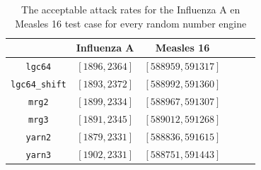 \documentclass[natbib=true]{acmart}
\begin{document}
\begin{table}[!hbt]
    \centering
    \bgroup
    \def\arraystretch{2}
    \begin{tabular}{c|c|c|c|c|c}
                                & \textbf{Influenza A}  & \textbf{Measles 16} \\ \hline
        \texttt{lgc64}          & \([1896, 2364]\)       & \([588959, 591317]\) \\
        \texttt{lgc64\_shift}   & \([1893, 2372]\)       & \([588992, 591360]\) \\
        \texttt{mrg2}           & \([1899, 2334]\)       & \([588967, 591307]\) \\
        \texttt{mrg3}           & \([1891, 2345]\)       & \([589012, 591268]\) \\
        \texttt{yarn2}          & \([1879, 2331]\)       & \([588836, 591615]\) \\
        \texttt{yarn3}          & \([1902, 2331]\)       & \([588751, 591443]\) \\
    \end{tabular}
    \egroup
    \caption{The acceptable attack rates for the Influenza A en Measles 16 test case for every random number engine}
    \label{tab:ranges_engines}
\end{table}
\end{document}
